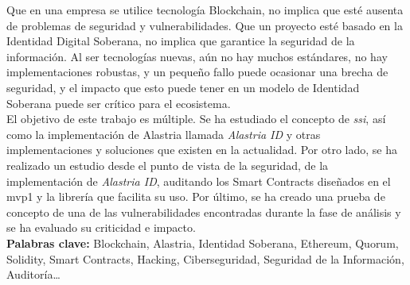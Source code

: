 Que en una empresa se utilice tecnología Blockchain, no implica que esté ausenta de problemas de seguridad y vulnerabilidades. Que un proyecto esté basado en la Identidad Digital Soberana, no implica que garantice la seguridad de la información. Al ser tecnologías nuevas, aún no hay muchos estándares, no hay implementaciones robustas, y un pequeño fallo puede ocasionar una brecha de seguridad, y el impacto que esto puede tener en un modelo de Identidad Soberana puede ser crítico para el ecosistema.\\

El objetivo de este trabajo es múltiple. Se ha estudiado el concepto de \textit{\acrfull{ssi}}, así como la implementación de Alastria llamada \textit{Alastria ID} y otras implementaciones y soluciones que existen en la actualidad. Por otro lado, se ha realizado un estudio desde el punto de vista de la seguridad, de la implementación de \textit{Alastria ID}, auditando los Smart Contracts diseñados en el \acrshort{mvp}1 y la librería que facilita su uso. Por último, se ha creado una prueba de concepto de una de las vulnerabilidades encontradas durante la fase de análisis y se ha evaluado su criticidad e impacto.\\

\textbf{Palabras clave:} Blockchain, Alastria, Identidad Soberana, Ethereum, Quorum, Solidity, Smart Contracts, Hacking, Ciberseguridad, Seguridad de la Información, Auditoría\ldots


